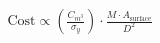 \documentclass[preview]{standalone}
\begin{document}
\begin{align*}
\text{Cost} \propto \left( \frac{C_{m^3}}{\sigma_y} \right) \cdot \frac{M \cdot A_{\text{surface}}}{D^2}
\end{align*}
\end{document}
